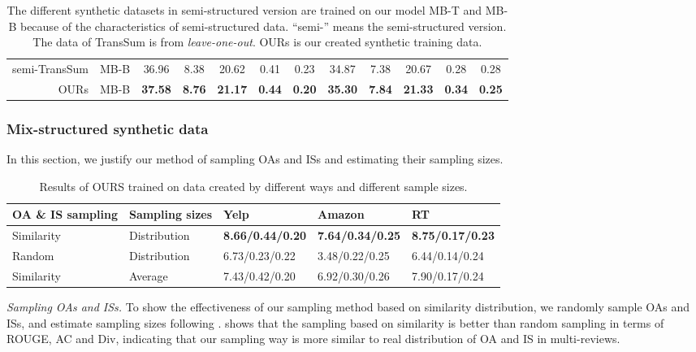 {\begin{table}[th]
\begin{center}
\begin{tabular}{|r|c|c|c|c|c|c|c|c|c|c|c|}
			semi-TransSum& MB-B & 36.96& 8.38 & 20.62 & 0.41 & 0.23 & 34.87 & 7.38 &  20.67& 0.28 & 0.28 \\
			OURs& MB-B & \bf 37.58 & \bf 8.76 & \bf 21.17 & \bf 0.44 & \bf 0.20 & \bf 35.30 & \bf 7.84 & \bf 21.33 & \bf 0.34 & \bf 0.25 \\ 
			\hline
		\end{tabular}
	\end{center}
	\caption{The different synthetic datasets in semi-structured version
		are trained on our model MB-T and MB-B because of the characteristics of semi-structured data. ``semi-'' means the semi-structured version. The data of TransSum is from {\em leave-one-out}. OURs is our created synthetic training data.}
	\label{tab:traindata}  
\end{table}
}%

\subsubsection{Mix-structured synthetic data}
In this section, 
we justify 
our method of 
sampling OAs and ISs and estimating their sampling sizes.

\begin{table}[th]
	\centering
	\scriptsize
	\begin{tabular}{|m{1cm}<{\centering}m{0.9cm}<{\centering}m{1.2cm}<{\centering}m{1.2cm}<{\centering}m{1.3cm}<{\centering}|}
		\hline
		\bf OA \& IS sampling & \bf Sampling sizes & \bf Yelp & \bf Amazon & \bf RT \\
		\hline
		Similarity & Distribution & \bf 8.66/0.44/0.20 & \bf 7.64/0.34/0.25 & \bf 8.75/0.17/0.23 \\
		Random& Distribution & 6.73/0.23/0.22 & 3.48/0.22/0.25& 6.44/0.14/0.24  \\
		Similarity & Average & 7.43/0.42/0.20 & 6.92/0.30/0.26 & 7.90/0.17/0.24 \\
		\hline
	\end{tabular}
	\caption{Results of OURS trained on data created by different ways and different sample sizes.}
	\label{tab:sample_abl}
\end{table}

{\em Sampling OAs and ISs.} To show the effectiveness of our sampling method based on similarity distribution, we randomly sample OAs and ISs, and estimate sampling sizes following . 
 shows that the sampling based on similarity is better than random sampling in terms of ROUGE, AC and Div, indicating that our sampling way is more similar to real distribution of OA and IS in multi-reviews.

